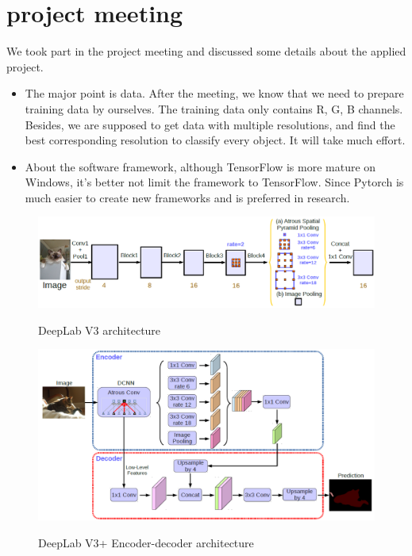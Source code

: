 \documentclass[]{IEEEtran}
\begin{document}
\section{project meeting}
	We took part in the project meeting and discussed some details about the applied project.
	\begin{itemize}
		\item The major point is data. After the meeting, we know that we need to prepare training data by ourselves. The training data only contains R, G, B channels. Besides, we are supposed to get data with multiple resolutions, and find the best corresponding resolution to classify every object. It will take much effort.
		\item About the software framework, although TensorFlow is more mature on Windows, it's better not limit the framework to TensorFlow. Since Pytorch is much easier to create new frameworks and is preferred in research.
	\end{itemize}
\newpage
\begin{figure}[!hbt]
		\vspace{2cm}
		\begin{center}
			\includegraphics[width=\columnwidth]{dl3}
			\caption{DeepLab V3 architecture}
			\label{fig:mp}
		    \hspace{0.5cm}
			\includegraphics[width=\columnwidth]{dl3pl}
			\caption{DeepLab V3+ Encoder-decoder architecture}
			\label{fig:ss}
		\end{center}
	\end{figure}
\end{document}

